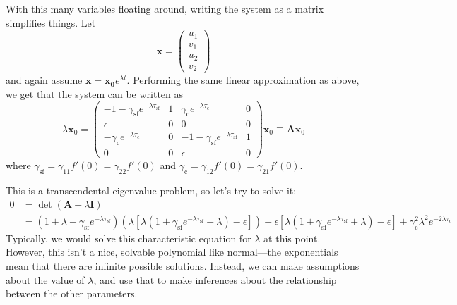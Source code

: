 \documentclass{article}
\renewcommand{\vec}{\mathbf}
\newcommand{\self}{{\text{sf}}}
\newcommand{\cpl}{\text{c}}
\begin{document}
    With this many variables floating around, writing the system as a matrix simplifies things. Let
    \begin{equation*}
        \vec{x} = \begin{pmatrix}
            u_1\\v_1\\u_2\\v_2
        \end{pmatrix}
    \end{equation*}
    and again assume $\vec{x} = \vec{x_0}e^{\lambda t}$. Performing the same linear approximation as above, we get that the system can be written as
    \begin{equation}
        \lambda \vec{x}_0 = \begin{pmatrix}
            -1-\gamma_{\self} e^{-\lambda \tau_{\self}} & 1 & \gamma_\cpl  e^{-\lambda \tau_\cpl} & 0 \\
            \epsilon & 0 & 0 & 0 \\
            -\gamma_\cpl  e^{-\lambda \tau_\cpl} & 0 & -1-\gamma_\self  e^{-\lambda \tau_\self} & 1\\
            0 & 0 & \epsilon & 0
        \end{pmatrix}
        \vec{x}_0 \equiv
        \vec{A}\vec{x}_0
    \end{equation}
    where $\gamma_{\self} = \gamma_{11}f'(0) = \gamma_{22}f'(0)$ and $\gamma_\cpl = \gamma_{12}f'(0) = \gamma_{21}f'(0)$.

    This is a transcendental eigenvalue problem, so let's try to solve it:
    \begin{align*}
        0 &=\det(\vec{A} - \lambda \vec{I}) \\
        &= \left(
                1+\lambda + \gamma_\self e^{-\lambda\tau_\self}
            \right) \left(
            \lambda \left[
                \lambda \left(
                    1 + \gamma_\self e^{-\lambda \tau_\self} + \lambda
                \right) - \epsilon
            \right]
        \right) 
        - \epsilon \left[
            \lambda \left(
                1 + \gamma_\self e^{-\lambda \tau_\self} + \lambda
            \right) - \epsilon
        \right] 
        + \gamma_\cpl^2\lambda^2 e^{-2\lambda \tau_\cpl}
    \end{align*}
    Typically, we would solve this characteristic equation for $\lambda$ at this point. However, this isn't a nice, solvable polynomial like normal---the exponentials mean that there are infinite possible solutions. Instead, we can make assumptions about the value of $\lambda$, and use that to make inferences about the relationship between the other parameters.
\end{document}
